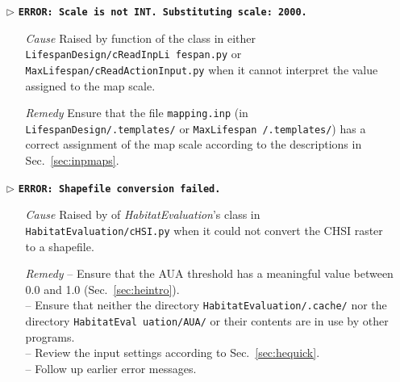 \begin{itemize}
	\item[$\triangleright$]\textbf{\texttt{ERROR: Scale is not INT. Substituting scale: 2000.}}
	\begin{itemize}
		\item[\textit{Cause}\hspace{0.27cm}] Raised by  function of the  class in either \texttt{LifespanDesign/cReadInpLi fespan.py} or \texttt{MaxLifespan/cReadActionInput.py} when it cannot interpret the value assigned to the map scale.
		\item[\textit{Remedy}] Ensure that the file \texttt{mapping.inp} (in \texttt{LifespanDesign/.templates/} or \texttt{MaxLifespan /.templates/}) has a correct assignment of the map scale according to the descriptions in Sec.~\ref{sec:inpmaps}.\\
	\end{itemize}
	
	\item[$\triangleright$]\textbf{\texttt{ERROR: Shapefile conversion failed.}}
	\begin{itemize}
		\item[\textit{Cause}\hspace{0.27cm}] Raised by  of \textit{HabitatEvaluation}'s  class in \texttt{HabitatEvaluation/cHSI.py} when it could not convert the CHSI raster to a shapefile.
		\item[\textit{Remedy}] -- Ensure that the AUA threshold has a meaningful value between 0.0 and 1.0 (Sec.~\ref{sec:heintro}).\\
							 -- Ensure that neither the directory \texttt{HabitatEvaluation/.cache/} nor the directory \texttt{HabitatEval uation/AUA/} or their contents are in use by other programs.\\
							 -- Review the input settings according to Sec.~\ref{sec:hequick}.\\
							 -- Follow up earlier error messages.\\
	\end{itemize}
	

\end{itemize}
